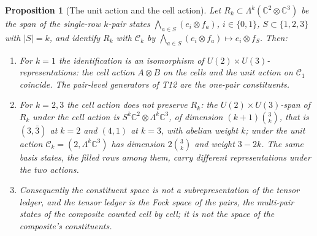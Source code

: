 \documentclass[11pt]{article}
\newtheorem{proposition}[theorem]{Proposition}
\theoremstyle{definition}
\theoremstyle{plain}
\providecommand{\C}{}\renewcommand{\C}{\mathbb{C}}
\providecommand{\Con}{}\renewcommand{\Con}{\mathcal{C}}
\begin{document}
\begin{proposition}[The unit action and the cell action]\label{c:lepton.unit-action-cell-action}
Let $R_{k} \subset \Lambda^{k}(\C^{2} \otimes \C^{3})$ be the span of the single-row $k$-pair states $\bigwedge_{a \in S}(e_{i} \otimes f_{a})$, $i \in \{0, 1\}$, $S \subset \{1,2,3\}$ with $|S| = k$, and identify $R_{k}$ with $\Con_{k}$ by $\bigwedge_{a \in S}(e_{i} \otimes f_{a}) \mapsto e_{i} \otimes f_{S}$. Then:
\begin{enumerate}
\item For $k = 1$ the identification is an isomorphism of $U(2) \times U(3)$-representations: the cell action $A \otimes B$ on the cells and the unit action on $\Con_{1}$ coincide. The pair-level generators of T12 are the one-pair constituents.
\item For $k = 2, 3$ the cell action does not preserve $R_{k}$: the $U(2) \times U(3)$-span of $R_{k}$ under the cell action is $S^{k}\C^{2} \otimes \Lambda^{k}\C^{3}$, of dimension $(k+1)\binom{3}{k}$, that is $(3,\bar{3})$ at $k = 2$ and $(4,1)$ at $k = 3$, with abelian weight $k$; under the unit action $\Con_{k} = (2, \Lambda^{k}\C^{3})$ has dimension $2\binom{3}{k}$ and weight $3 - 2k$. The same basis states, the filled rows among them, carry different representations under the two actions.
\item Consequently the constituent space is not a subrepresentation of the tensor ledger, and the tensor ledger is the Fock space of the pairs, the multi-pair states of the composite counted cell by cell; it is not the space of the composite's constituents.
\end{enumerate}
\end{proposition}
\end{document}
